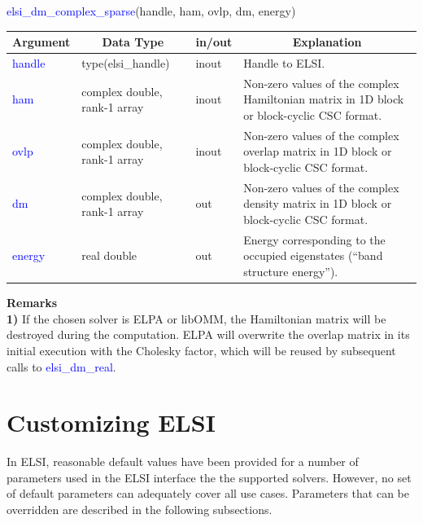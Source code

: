 \documentclass{report}
\begin{document}
\bigskip
\begin{labeling}{\hspace{6cm}}
\item [\hspace{0.3cm} \textcolor{blue}{elsi\_dm\_complex\_sparse}(handle, ham, ovlp, dm, energy)]
\end{labeling}

\begin{tabular}[]{|p{20mm}|p{45mm}|p{15mm}|p{85mm}|}
\hline
\multicolumn{1}{|c|}{\textbf{Argument}} & \multicolumn{1}{c|}{\textbf{Data Type}} & \multicolumn{1}{c|}{\textbf{in/out}} & \multicolumn{1}{c|}{\textbf{Explanation}}\\
\hline
\textcolor{blue}{handle} & type(elsi\_handle)           & inout & Handle to ELSI.\\
\hline
\textcolor{blue}{ham}    & complex double, rank-1 array & inout & Non-zero values of the complex Hamiltonian matrix in 1D block or block-cyclic CSC format.\\
\hline
\textcolor{blue}{ovlp}   & complex double, rank-1 array & inout & Non-zero values of the complex overlap matrix in 1D block or block-cyclic CSC format.\\
\hline
\textcolor{blue}{dm}     & complex double, rank-1 array & out   & Non-zero values of the complex density matrix in 1D block or block-cyclic CSC format.\\
\hline
\textcolor{blue}{energy} & real double                  & out   & Energy corresponding to the occupied eigenstates (``band structure energy'').\\
\hline
\end{tabular}

\bigskip
\textbf{Remarks}\\

\textbf{1)} If the chosen solver is ELPA or libOMM, the Hamiltonian matrix will be destroyed during the computation.  ELPA will overwrite the overlap matrix in its initial execution with the Cholesky factor, which will be reused by subsequent calls to \textcolor{blue}{elsi\_dm\_real}.\\

\section{Customizing ELSI}
\label{sec:setter}
In ELSI, reasonable default values have been provided for a number of parameters used in the ELSI interface the the supported solvers.  However, no set of default parameters can adequately cover all use cases.  Parameters that can be overridden are described in the following subsections.
\end{document}
